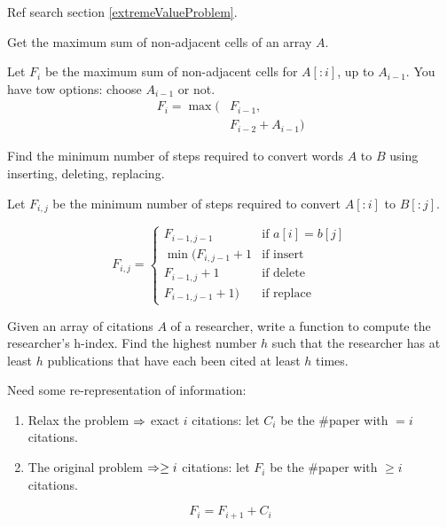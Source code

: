 Ref search section \ref{extremeValueProblem}.

 Get the maximum sum of non-adjacent
cells of an array $A$.

Let $F_i$ be the maximum sum of non-adjacent cells for $A[:i]$, up to $A_{i-1}$. You have tow options:
choose $A_{i-1}$ or not.
\begin{align*}
F_{i} = \max\big(
&F_{i-1}, \\ 
&F_{i-2}+A_{i-1}
\big)
\end{align*}

 Find the minimum number of steps required to convert words $A$ to $B$ using inserting, deleting, replacing. 

Let $F_{i, j}$ be the minimum number of steps required to convert $A[:i]$ to $B[:j]$.
\begin{center}
\end{center}
\[
    F_{i, j} =
    \begin{cases}
        F_{i-1, j-1} & \text{if } a[i] = b[j] \\[8pt]
        \min \Big( 
        F_{i, j-1} + 1 & \text{if insert} \\ 
        F_{i-1, j} + 1 & \text{if delete} \\ 
        F_{i-1, j-1} + 1 \Big) & \text{if replace}
    \end{cases}
\]

 Given an array of citations $A$ of a researcher, write a function to compute the researcher's h-index. Find the highest number $h$ such that the researcher has at least $h$ publications that have each been cited at least $h$ times.

Need some re-representation of information: 
\begin{enumerate}
\item Relax the problem $\Rightarrow$ exact $i$ citations: let $C_i$ be the \#paper with $=i$ citations.
\item The original problem $\Rightarrow \geq i$ citations: let $F_i$ be the \#paper with $\geq i$ citations.
\end{enumerate}
$$
F_i = F_{i+1} + C_i
$$

